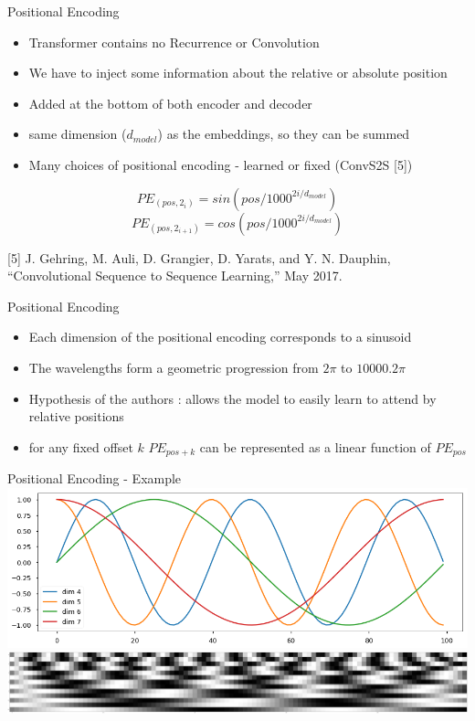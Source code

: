\documentclass{beamer}
\begin{document}
\begin{frame}[fragile]{Positional Encoding}
\begin{center}
	\begin{itemize}
		\item Transformer contains no Recurrence or Convolution
		\item We have to inject some information about the relative or absolute position
		\item Added at the bottom of both encoder and decoder
		\item same dimension ($d_{model}$) as the embeddings, so they can be summed
		\item Many choices of positional encoding - learned or fixed (ConvS2S [5])
	\end{itemize}
	$$PE_{(pos, 2_{i})} = sin(pos/1000^{2i/d_{model}})$$
	$$PE_{(pos, 2_{i+1})} = cos(pos/1000^{2i/d_{model}})$$
	
	[5] J. Gehring, M. Auli, D. Grangier, D. Yarats, and Y. N. Dauphin, “Convolutional Sequence to Sequence Learning,” May 2017.
\end{center}
\end{frame}

\begin{frame}[fragile]{Positional Encoding}
 \begin{itemize}
 	\item Each dimension of the positional encoding corresponds to a sinusoid
 	\item The wavelengths form a geometric progression from $2\pi$ to $10000 . 2\pi$
 	\item Hypothesis of the authors : allows the model to easily learn to attend by relative positions
 	\item  for any fixed offset $k$ $PE_{pos+k}$ can be represented as a linear function of $PE_{pos}$
 \end{itemize}
\end{frame}


\begin{frame}[fragile]{Positional Encoding - Example}
	\includegraphics[width=\textwidth,height=\textheight,keepaspectratio]{pos_enc2.png}
	\includegraphics[width=\textwidth,height=\textheight,keepaspectratio]{pos_enc.png}
\end{frame}
\end{document}
